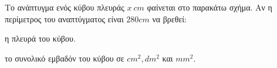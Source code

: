 \documentclass[11pt,a4paper,modern]{FFExercises}
\begin{document}
\askhsh Το ανάπτυγμα ενός κύβου πλευράς $x\ \si{cm}$ φαίνεται στο παρακάτω σχήμα. Αν η περίμετρος του αναπτύγματος είναι $280\si{cm}$ να βρεθεί:
\begin{center}
\end{center}
\begin{alist}
\item η πλευρά του κύβου.
\item το συνολικό εμβαδόν του κύβου σε $\si{cm^2},\si{dm^2}$ και $\si{mm^2}$.
\end{alist}
\end{document}
